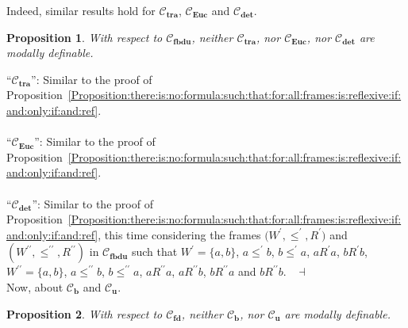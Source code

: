 \documentclass[draft]{article}
\newtheorem{proposition}{Proposition}
\newenvironment{proof}{{\bf Proof:}}{~$\dashv$\\}
\def\bcfra{\mathbf{b}}
\def\fdcfra{\mathbf{fd}}
\def\deterministic{\mathbf{det}}
\def\Euclidean{\mathbf{Euc}}
\def\transitive{\mathbf{tra}}
\def\fbducfra{\mathbf{fbdu}}
\def\ucfra{\mathbf{u}}
\begin{document}
%
%
%
%
Indeed, similar results hold for ${\mathcal C}_{\transitive}$, ${\mathcal C}_{\Euclidean}$ and ${\mathcal C}_{\deterministic}$.
%
%
\begin{proposition}\label{Proposition:there:is:no:formula:such:that:for:all:frames:is:transitive:if:and:only:if:and:ref}
%
%
With respect to ${\mathcal C}_{\fbducfra}$, neither ${\mathcal C}_{\transitive}$, nor ${\mathcal C}_{\Euclidean}$, nor ${\mathcal C}_{\deterministic}$ are modally definable.
%
%
\end{proposition}
%
%
\begin{proof}
%
%
``${\mathcal C}_{\transitive}$'':
Similar to the proof of Proposition~\ref{Proposition:there:is:no:formula:such:that:for:all:frames:is:reflexive:if:and:only:if:and:ref}.
%
%
\\
\\
%
%
``${\mathcal C}_{\Euclidean}$'':
Similar to the proof of Proposition~\ref{Proposition:there:is:no:formula:such:that:for:all:frames:is:reflexive:if:and:only:if:and:ref}.
%
%
\\
\\
%
%
``${\mathcal C}_{\deterministic}$'':
Similar to the proof of Proposition~\ref{Proposition:there:is:no:formula:such:that:for:all:frames:is:reflexive:if:and:only:if:and:ref}, this time considering the frames $(W^{\prime},
%
%
%
%
%
%
%
$\linebreak$
%
%
%
%
%
%
{\leq^{\prime}},{R^{\prime}})$ and $(W^{\prime\prime},{\leq^{\prime\prime}},{R^{\prime\prime}})$ in ${\mathcal C}_{\fbducfra}$ such that $W^{\prime}{=}\{a,b\}$, $a{\leq^{\prime}}b$, $b{\leq^{\prime}}a$, $a{R^{\prime}}a$, $b{R^{\prime}}b$, $W^{\prime\prime}{=}\{a,b\}$, $a{\leq}^{\prime\prime}b$, $b{\leq}^{\prime\prime}a$, $a{R^{\prime\prime}}a$, $a{R^{\prime\prime}}b$, $b{R^{\prime\prime}}a$ and $b{R^{\prime\prime}}b$.
%
%
\medskip
%
%
\end{proof}
%
%
%
%
Now, about ${\mathcal C}_{\bcfra}$ and ${\mathcal C}_{\ucfra}$.
%
%
\begin{proposition}\label{Proposition:backward:confluence:is:not:modally:definable}
%
%
With respect to ${\mathcal C}_{\fdcfra}$, neither ${\mathcal C}_{\bcfra}$, nor ${\mathcal C}_{\ucfra}$ are modally definable.
%
%
\end{proposition}
\end{document}
